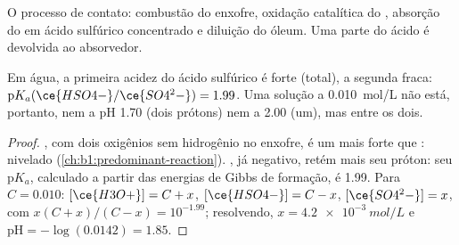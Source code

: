 \begin{omfigure}

{\small O processo de contato: combustão do enxofre, oxidação catalítica do
, absorção do  em ácido sulfúrico concentrado e diluição
do óleum. Uma parte do ácido é devolvida ao absorvedor.}
\end{omfigure}

\begin{proposition}\label{prop:b1:p-block-16-18:sulfuric-strength}
Em água, a primeira acidez do ácido sulfúrico é forte (total), a segunda
fraca: $\mathrm{p}K_a(\ce{HSO4-}/\ce{SO4^2-}) = 1.99$. Uma solução a
\qty{0.010}{mol/L} não está, portanto, nem a pH 1.70 (dois prótons) nem a
2.00 (um), mas entre os dois.
\end{proposition}

\begin{proof}
, com dois oxigênios sem hidrogênio no enxofre, é um 
mais forte que : nivelado (\cref{ch:b1:predominant-reaction}).
, já negativo, retém mais seu próton: seu $\mathrm{p}K_a$,
calculado a partir das energias de Gibbs de formação, é 1.99. Para $C = 0.010$:
$[\ce{H3O+}] = C + x$, $[\ce{HSO4-}] = C - x$, $[\ce{SO4^2-}] = x$, com
$x(C + x)/(C - x) = 10^{-1.99}$; resolvendo, $x = \qty{4.2e-3}{mol/L}$ e
$\mathrm{pH} = -\log(0.0142) = 1.85$.
\end{proof}

